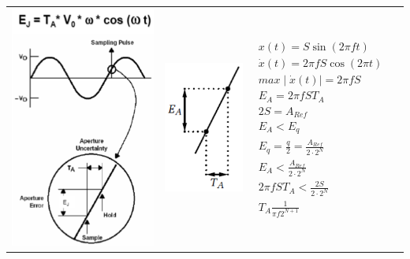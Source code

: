 \begin{longtable}[c]{ l  l l l }
\begin{minipage}{4cm}

  \includegraphics[scale=0.45]{pictures/aperturfehlercos}

\end{minipage}
&
\begin{minipage}{3cm}

  \includegraphics[scale=0.5]{pictures/aperturfehler}
\end{minipage}
&
\begin{minipage}{5cm}
\begin{gather*}
x(t)=S\sin(2\pi ft)\\
\dot{x}(t)=2\pi fS\cos(2\pi t)\\
max\mid\dot{x}(t)\mid= 2\pi fS \\
E_{A}=2\pi fST_{A}\\
2S=A_{Ref}\\
E_{A}<E_{q}\\
E_{q}=\frac{q}{2}=\frac{A_{Ref}}{2\cdot2^N}\\
E_{A}<\frac{A_{Ref}}{2\cdot2^N}\\
2\pi fST_{A} <\frac{2S}{2\cdot2^N}\\
T_{A}\frac{1}{\pi f2^{N+1}}
\end{gather*}
\end{minipage}


\end{longtable}
